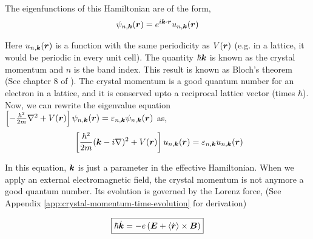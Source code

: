 \documentclass{report}
\renewcommand\vec[1]{\ensuremath\boldsymbol{#1}} %
\begin{document}
The eigenfunctions of this Hamiltonian are of the form,
$$\psi_{n, \vec{k}} (\vec{r}) = e^{i \vec{k}\cdot \vec{r}} u_{n,\vec{k}} (\vec{r})$$

Here $u_{n,\vec{k}} (\vec{r})$ is a function with the same periodicity as $V(\vec{r})$ (e.g. in a lattice, it would be periodic in every unit cell). The quantity $\hbar \vec{k}$ is known as the crystal momentum and $n$ is the band index. This result is known as Bloch's theorem (See chapter 8 of \cite{book:AshcroftMermin76}). The crystal momentum is a good quantum number for an electron in a lattice, and it is conserved upto a reciprocal lattice vector (times $\hbar$).
Now, we can rewrite the eigenvalue equation $\left[-\frac{\hbar^2}{2m}\nabla^2 + V(\vec{r}) \right] \psi_{n, \vec{k}}(\vec{r}) = \varepsilon_{n,\vec{k}} \psi_{n, \vec{k}}(\vec{r})$ as,
\begin{equation}~\label{Eq:effectiveBlochEquation}
	\left[\frac{\hbar^2}{2m}(\vec{k} - i \nabla)^2 + V(\vec{r}) \right]u_{n,\vec{k}} (\vec{r}) = \varepsilon_{n,\vec{k}} u_{n,\vec{k}} (\vec{r})
\end{equation}

In this equation, $\vec{k}$ is just a parameter in the effective Hamiltonian. When we apply an external electromagnetic field, the crystal momentum is not anymore a good quantum number. Its evolution is governed by the Lorenz force, (See Appendix \ref{app:crystal-momentum-time-evolution} for derivation)

\begin{equation} \label{Eq:evolution-of-k}
	\boxed{\hbar \dot{\vec{k}} = -e\left(\vec{E} + \langle\dot{\vec{r}}\rangle \times \vec{B} \right)}
\end{equation}
\end{document}
